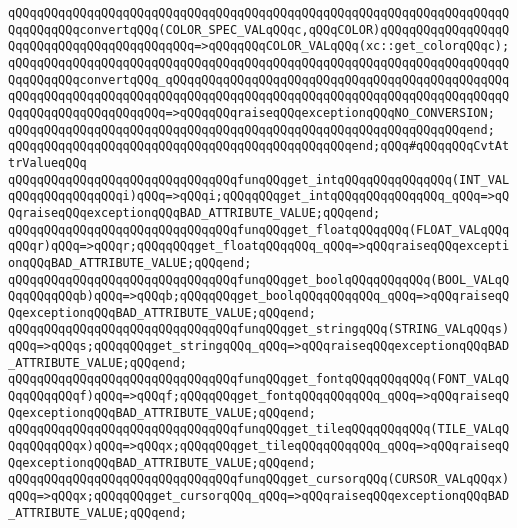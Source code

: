 \verb|qQQqqQQqqQQqqQQqqQQqqQQqqQQqqQQqqQQqqQQqqQQqqQQqqQQqqQQqqQQqqQQqqQQqqQQqqQQqqQQqconvertqQQq(COLOR_SPEC_VALqQQqc,qQQqCOLOR)qQQqqQQqqQQqqQQqqQQqqQQqqQQqqQQqqQQqqQQqqQQq=>qQQqqQQqCOLOR_VALqQQq(xc::get_colorqQQqc);|\newline
\verb|qQQqqQQqqQQqqQQqqQQqqQQqqQQqqQQqqQQqqQQqqQQqqQQqqQQqqQQqqQQqqQQqqQQqqQQqqQQqqQQqconvertqQQq_qQQqqQQqqQQqqQQqqQQqqQQqqQQqqQQqqQQqqQQqqQQqqQQqqQQqqQQqqQQqqQQqqQQqqQQqqQQqqQQqqQQqqQQqqQQqqQQqqQQqqQQqqQQqqQQqqQQqqQQqqQQqqQQqqQQqqQQqqQQq=>qQQqqQQqraiseqQQqexceptionqQQqNO_CONVERSION;|\newline
\verb|qQQqqQQqqQQqqQQqqQQqqQQqqQQqqQQqqQQqqQQqqQQqqQQqqQQqqQQqqQQqqQQqend;|\newline
\verb|qQQqqQQqqQQqqQQqqQQqqQQqqQQqqQQqqQQqqQQqqQQqqQQqend;qQQq#qQQqqQQqCvtAttrValueqQQq|\newline
\newline
\verb|qQQqqQQqqQQqqQQqqQQqqQQqqQQqqQQqfunqQQqget_intqQQqqQQqqQQqqQQq(INT_VALqQQqqQQqqQQqqQQqi)qQQq=>qQQqi;qQQqqQQqget_intqQQqqQQqqQQqqQQq_qQQq=>qQQqraiseqQQqexceptionqQQqBAD_ATTRIBUTE_VALUE;qQQqend;|\newline
\verb|qQQqqQQqqQQqqQQqqQQqqQQqqQQqqQQqfunqQQqget_floatqQQqqQQq(FLOAT_VALqQQqqQQqr)qQQq=>qQQqr;qQQqqQQqget_floatqQQqqQQq_qQQq=>qQQqraiseqQQqexceptionqQQqBAD_ATTRIBUTE_VALUE;qQQqend;|\newline
\verb|qQQqqQQqqQQqqQQqqQQqqQQqqQQqqQQqfunqQQqget_boolqQQqqQQqqQQq(BOOL_VALqQQqqQQqqQQqb)qQQq=>qQQqb;qQQqqQQqget_boolqQQqqQQqqQQq_qQQq=>qQQqraiseqQQqexceptionqQQqBAD_ATTRIBUTE_VALUE;qQQqend;|\newline
\verb|qQQqqQQqqQQqqQQqqQQqqQQqqQQqqQQqfunqQQqget_stringqQQq(STRING_VALqQQqs)qQQq=>qQQqs;qQQqqQQqget_stringqQQq_qQQq=>qQQqraiseqQQqexceptionqQQqBAD_ATTRIBUTE_VALUE;qQQqend;|\newline
\newline
\verb|qQQqqQQqqQQqqQQqqQQqqQQqqQQqqQQqfunqQQqget_fontqQQqqQQqqQQq(FONT_VALqQQqqQQqqQQqf)qQQq=>qQQqf;qQQqqQQqget_fontqQQqqQQqqQQq_qQQq=>qQQqraiseqQQqexceptionqQQqBAD_ATTRIBUTE_VALUE;qQQqend;|\newline
\verb|qQQqqQQqqQQqqQQqqQQqqQQqqQQqqQQqfunqQQqget_tileqQQqqQQqqQQq(TILE_VALqQQqqQQqqQQqx)qQQq=>qQQqx;qQQqqQQqget_tileqQQqqQQqqQQq_qQQq=>qQQqraiseqQQqexceptionqQQqBAD_ATTRIBUTE_VALUE;qQQqend;|\newline
\verb|qQQqqQQqqQQqqQQqqQQqqQQqqQQqqQQqfunqQQqget_cursorqQQq(CURSOR_VALqQQqx)qQQq=>qQQqx;qQQqqQQqget_cursorqQQq_qQQq=>qQQqraiseqQQqexceptionqQQqBAD_ATTRIBUTE_VALUE;qQQqend;|\newline
\newline
